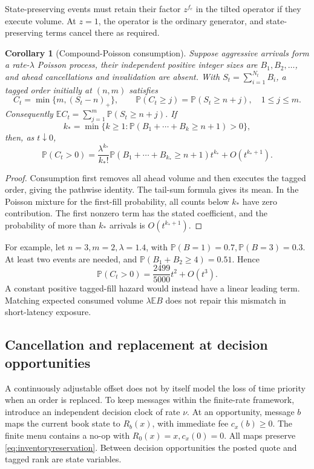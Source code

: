 \documentclass[11pt]{article}
\theoremstyle{plain}
\newtheorem{corollary}[theorem]{Corollary}
\theoremstyle{definition}
\theoremstyle{remark}
\newcommand{\E}{\mathbb E}
\begin{document}
State-preserving events must retain their factor
\(z^{f_e}\) in the tilted operator if they execute volume.
At \(z=1\), the operator is the ordinary generator, and
state-preserving terms cancel there as required.

\begin{corollary}[Compound-Poisson consumption]
\label{cor:compoundfills}
Suppose aggressive arrivals form a rate-\(\lambda\) Poisson process,
their independent positive integer sizes are \(B_1,B_2,\ldots\),
and ahead cancellations and invalidation are absent. With
\(S_t=\sum_{i=1}^{N_t}B_i\), a tagged order initially at
\((n,m)\) satisfies
\[
 C_t=\min\{m,(S_t-n)_+\},\qquad
 \mathbb P(C_t\ge j)=\mathbb P(S_t\ge n+j),\quad 1\le j\le m.
\]
Consequently
\(\E C_t=\sum_{j=1}^m\mathbb P(S_t\ge n+j)\).
If
\[
 k_*=\min\{k\ge1:\mathbb P(B_1+\cdots+B_k\ge n+1)>0\},
\]
then, as \(t\downarrow0\),
\[
 \mathbb P(C_t>0)=
 \frac{\lambda^{k_*}}{k_*!}
 \mathbb P(B_1+\cdots+B_{k_*}\ge n+1)t^{k_*}
 +O(t^{k_*+1}).
\]
\end{corollary}
\begin{proof}
Consumption first removes all ahead volume and then executes the
tagged order, giving the pathwise identity. The tail-sum formula
gives its mean. In the Poisson mixture for the first-fill probability,
all counts below \(k_*\) have zero contribution. The first nonzero
term has the stated coefficient, and the probability of more than
\(k_*\) arrivals is \(O(t^{k_*+1})\).
\end{proof}

For example, let \(n=3,m=2,\lambda=1.4\), with
\(\mathbb P(B=1)=0.7,\mathbb P(B=3)=0.3\). At least two events
are needed, and
\(\mathbb P(B_1+B_2\ge4)=0.51\). Hence
\[
 \mathbb P(C_t>0)=\frac{2499}{5000}t^2+O(t^3).
\]
A constant positive tagged-fill hazard would instead have a
linear leading term. Matching expected consumed volume
\(\lambda\E B\) does not repair this mismatch in short-latency
exposure.


\subsection{Cancellation and replacement at decision opportunities}

A continuously adjustable offset does not by itself model the loss
of time priority when an order is replaced. To keep messages within
the finite-rate framework, introduce an independent decision clock
of rate \(\nu\). At an opportunity, message \(b\) maps the current
book state to \(R_b(x)\), with immediate fee \(c_x(b)\ge0\).
The finite menu contains a no-op with \(R_0(x)=x,c_x(0)=0\).
All maps preserve \eqref{eq:inventoryreservation}. Between decision
opportunities the posted quote and tagged rank are state variables.
\end{document}
